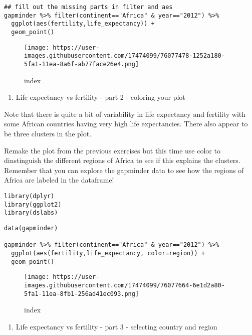 \documentclass[]{article}
\providecommand{\tightlist}{%
  \setlength{\itemsep}{0pt}\setlength{\parskip}{0pt}}
\begin{document}
\begin{verbatim}
## fill out the missing parts in filter and aes
gapminder %>% filter(continent=="Africa" & year=="2012") %>%
  ggplot(aes(fertility,life_expectancy)) +
  geom_point()
\end{verbatim}

\begin{figure}
\centering
\texttt{[image: https://user-images.githubusercontent.com/17474099/76077478-1252a180-5fa1-11ea-8a6f-ab77face26e4.png]}
\caption{index}
\end{figure}

\begin{enumerate}
\def\labelenumi{\arabic{enumi}.}
\setcounter{enumi}{1}
\tightlist
\item
  Life expectancy vs fertility - part 2 - coloring your plot
\end{enumerate}

Note that there is quite a bit of variability in life expectancy and
fertility with some African countries having very high life
expectancies. There also appear to be three clusters in the plot.

Remake the plot from the previous exercises but this time use color to
dinstinguish the different regions of Africa to see if this explains the
clusters. Remember that you can explore the gapminder data to see how
the regions of Africa are labeled in the dataframe!

\begin{verbatim}
library(dplyr)
library(ggplot2)
library(dslabs)
\end{verbatim}

\begin{verbatim}
data(gapminder)

gapminder %>% filter(continent=="Africa" & year=="2012") %>%
  ggplot(aes(fertility,life_expectancy, color=region)) +
  geom_point()
\end{verbatim}

\begin{figure}
\centering
\texttt{[image: https://user-images.githubusercontent.com/17474099/76077664-6e1d2a80-5fa1-11ea-8fb1-256ad41ec093.png]}
\caption{index}
\end{figure}

\begin{enumerate}
\def\labelenumi{\arabic{enumi}.}
\setcounter{enumi}{2}
\tightlist
\item
  Life expectancy vs fertility - part 3 - selecting country and region
\end{enumerate}
\end{document}
